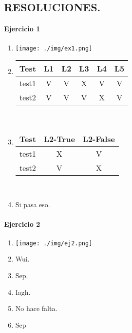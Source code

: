 \documentclass{article}
\begin{document}


\begin{center}
\section*{RESOLUCIONES.}
\end{center}

\paragraph{Ejercicio 1}

\begin{multicols}{2}
\begin{enumerate}
\item \texttt{[image: ./img/ex1.png]}
\item 
\begin{tabular}{|c|c|c|c|c|c|}
\hline 
Test & L1 & L2 & L3 & L4 & L5 \\ 
\hline 
test1 & V & V & X & V & V \\ 
\hline 
test2 & V & V & V & X & V \\ 
\hline 
\end{tabular} \bigskip\\
\item \begin{tabular}{|c|c|c|}
\hline 
Test & L2-True & L2-False \\ 
\hline 
test1 & X & V \\ 
\hline 
test2 & V & X \\ 
\hline 
\end{tabular}\bigskip\\
\item Si pasa eso.
\end{enumerate}
\end{multicols}

\paragraph{Ejercicio 2}

\begin{multicols}{2}
\begin{enumerate}
\item \texttt{[image: ./img/ej2.png]}
\item Wui.
\item	Sep.
\item Iagh.
\item No hace falta.\item	Sep
\end{enumerate}
\end{multicols}
\end{document}
